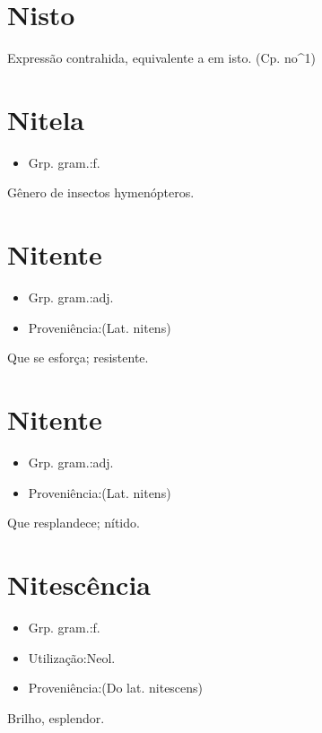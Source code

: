 \section{Nisto}
Expressão contrahida, equivalente a \textunderscore em isto\textunderscore .
(Cp. \textunderscore no\textunderscore ^1)
\section{Nitela}
\begin{itemize}
\item {Grp. gram.:f.}
\end{itemize}
Gênero de insectos hymenópteros.
\section{Nitente}
\begin{itemize}
\item {Grp. gram.:adj.}
\end{itemize}
\begin{itemize}
\item {Proveniência:(Lat. \textunderscore nitens\textunderscore )}
\end{itemize}
Que se esforça; resistente.
\section{Nitente}
\begin{itemize}
\item {Grp. gram.:adj.}
\end{itemize}
\begin{itemize}
\item {Proveniência:(Lat. \textunderscore nitens\textunderscore )}
\end{itemize}
Que resplandece; nítido.
\section{Nitescência}
\begin{itemize}
\item {Grp. gram.:f.}
\end{itemize}
\begin{itemize}
\item {Utilização:Neol.}
\end{itemize}
\begin{itemize}
\item {Proveniência:(Do lat. \textunderscore nitescens\textunderscore )}
\end{itemize}
Brilho, esplendor.
